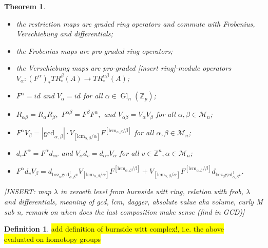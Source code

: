 \documentclass[10pt, a4paper, UKenglish]{article}
\numberwithin{equation}{section}
\newcommand{\cM}{\mathcal{M}}
\newcommand{\bZ}{\mathbb{Z}}
\newcommand{\abs}[1]{\left\vert#1\right\vert}	%
\newcommand{\bez}{\mathrm{bez}}
\renewcommand{\gcd}{\mathrm{gcd}}
\newcommand{\lcm}{\mathrm{lcm}}
\newcommand{\Gl}{\operatorname{Gl}}
\newcommand{\comm}[1]{\colorbox{yellow}{#1}}
\theoremstyle{plain}
\newtheorem{thm}[equation]{Theorem}
\theoremstyle{definition}
\newtheorem{defn}[equation]{Definition}
\renewcommand{\to}{\longrightarrow}
\begin{document}
\begin{thm}
\begin{itemize}
 \item the restriction maps are graded ring operators and commute with Frobenius, Verschiebung and differentials;
 \item the Frobenius maps are pro-graded ring operators;
 \item the Verschiebung maps are pro-graded [insert ring]-module operators\\%
    $V_\alpha: (F^\alpha)_* TR_*^\beta(A) \to TR_*^{\alpha\beta}(A)$;
 \item $F^\alpha = id$ and $V_\alpha = id$ for all $\alpha \in \Gl_n(\bZ_p)$;
 \item $R_{\alpha\beta} = R_\alpha R_\beta,$ $F^{\alpha\beta} = F^\beta F^\alpha,$ and $V_{\alpha\beta} = V_\alpha V_\beta$ for all $\alpha, \beta \in \cM_n$;
 \item $F^\alpha V_\beta = \abs{\gcd_{\alpha,\beta}} \cdot V_{[\lcm_{\alpha,\beta} / \alpha]}F^{[\lcm_{\alpha,\beta} / \beta]}$ %
    for all $\alpha, \beta \in \cM_n$;
 \item $d_v F^\alpha = F^\alpha d_{\alpha v}$ and $V_\alpha d_v = d_{\alpha v} V_\alpha$ for all $v \in \bZ^n, \alpha \in \cM_n$;
 \item $F^\alpha d_v V_\beta = d_{\bez_{\alpha}\gcd_{\alpha,\beta}^\dagger v} %
    V_{[\lcm_{\alpha,\beta} / \alpha]} F^{[\lcm_{\alpha,\beta} / \beta]} + %
    V_{[\lcm_{\alpha,\beta} / \alpha]} F^{[\lcm_{\alpha,\beta} / \beta]}%
    d_{\bez_{\beta}\gcd_{\alpha,\beta}^\dagger v}.$
\end{itemize}
[INSERT: map $\lambda$ in zeroeth level from burnside witt ring, relation with frob, $\lambda$ and
differentials, meaning of gcd, lcm, dagger, absolute value aka volume, curly M sub n, remark on
when does the last composition make sense (find in GCD)]
\end{thm}
%
%
\begin{defn}\label{def_bwc}%
\comm{add definition of burnside witt complex!, i.e. the above}\\
\comm{evaluated on homotopy groups}
\end{defn}
%
%
\end{document}
